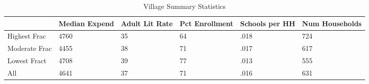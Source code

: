 \begin{table}[htbp]
\caption{\label{vsummary} Village Summary Statistics}\centering\medskip
\begin{tabular}{|l|l|l|l|l|l|}\hline  
 & Median Expend  & Adult Lit Rate  & Pct Enrollment  & Schools per HH  & Num Households  \\ \hline  
Highest Frac &      4760 &        35 &        64 &      .018 &       724 \\ \hline 
Moderate Frac &      4455 &        38 &        71 &      .017 &       617 \\ \hline 
Lowest Fract &      4708 &        39 &        77 &      .013 &       555 \\ \hline 
All &      4641 &        37 &        71 &      .016 &       631 \\ \hline 
  \end{tabular}
\end{table}
